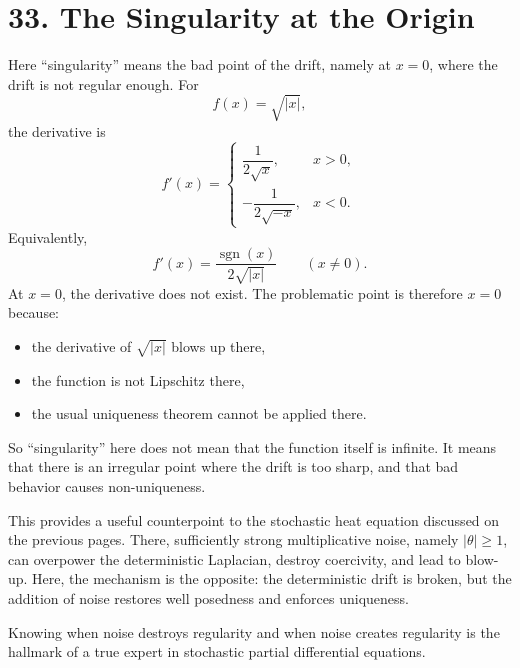 \documentclass[11pt]{article}
\theoremstyle{definition}
\theoremstyle{remark}
\begin{document}
\section*{33. The Singularity at the Origin}
Here ``singularity'' means the bad point of the drift, namely at $x=0$, where the drift is not regular enough. For
\[
f(x)=\sqrt{|x|},
\]
the derivative is
\[
f'(x)=
\begin{cases}
\dfrac{1}{2\sqrt{x}}, & x>0,\\[6pt]
-\dfrac{1}{2\sqrt{-x}}, & x<0.
\end{cases}
\]
Equivalently,
\[
f'(x)=\frac{\operatorname{sgn}(x)}{2\sqrt{|x|}}
\qquad (x\neq 0).
\]
At $x=0$, the derivative does not exist. The problematic point is therefore $x=0$ because:
\begin{itemize}
\item the derivative of $\sqrt{|x|}$ blows up there,
\item the function is not Lipschitz there,
\item the usual uniqueness theorem cannot be applied there.
\end{itemize}
So ``singularity'' here does not mean that the function itself is infinite. It means that there is an irregular point where the drift is too sharp, and that bad behavior causes non-uniqueness.

This provides a useful counterpoint to the stochastic heat equation discussed on the previous pages. There, sufficiently strong multiplicative noise, namely $|\theta|\ge 1$, can overpower the deterministic Laplacian, destroy coercivity, and lead to blow-up. Here, the mechanism is the opposite: the deterministic drift is broken, but the addition of noise restores well posedness and enforces uniqueness.

Knowing when noise destroys regularity and when noise creates regularity is the hallmark of a true expert in stochastic partial differential equations.
\end{document}
